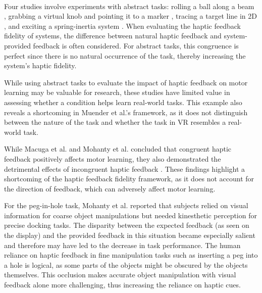 \paragraph{}
Four studies involve experiments with abstract tasks: rolling a ball along a beam \cite{Huang2006}, grabbing a virtual knob and pointing it to a marker \cite{Dai2023}, tracing a target line in 2D \cite{Fehlberg2012}, and exciting a spring-inertia system \cite{Huang2007}. When evaluating the haptic feedback fidelity of systems, the difference between natural haptic feedback and system-provided feedback is often considered. For abstract tasks, this congruence is perfect since there is no natural occurrence of the task, thereby increasing the system's haptic fidelity.

While using abstract tasks to evaluate the impact of haptic feedback on motor learning may be valuable for research, these studies have limited value in assessing whether a condition helps learn real-world tasks. This example also reveals a shortcoming in Muender et al.'s framework, as it does not distinguish between the nature of the task and whether the task in VR resembles a real-world task.

While Macuga et al. and Mohanty et al. concluded that congruent haptic feedback positively affects motor learning, they also demonstrated the detrimental effects of incongruent haptic feedback \cite{Macuga2019, Mohanty2023}. These findings highlight a shortcoming of the haptic feedback fidelity framework, as it does not account for the direction of feedback, which can adversely affect motor learning.

For the peg-in-hole task, Mohanty et al. reported that subjects relied on visual information for coarse object manipulations but needed kinesthetic perception for precise docking tasks. The disparity between the expected feedback (as seen on the display) and the provided feedback in this situation became especially salient and therefore may have led to the decrease in task performance. 
The human reliance on haptic feedback in fine manipulation tasks such as inserting a peg into a hole is logical, as some parts of the objects might be obscured by the objects themselves. This occlusion makes accurate object manipulation with visual feedback alone more challenging, thus increasing the reliance on haptic cues.

